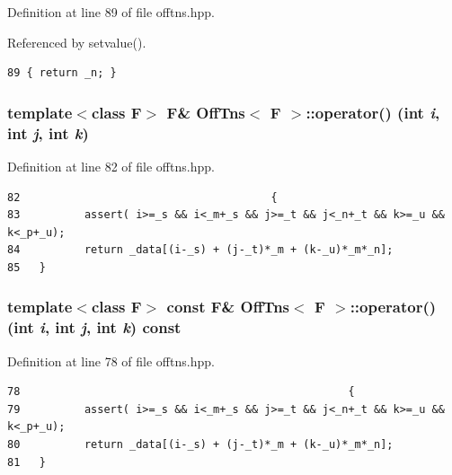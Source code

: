 Definition at line 89 of file offtns.hpp.

Referenced by setvalue().

\footnotesize\begin{verbatim}89 { return _n; }
\end{verbatim}\normalsize 


\subsubsection{\setlength{\rightskip}{0pt plus 5cm}template$<$class F$>$ F\& {\bf Off\-Tns}$<$ F $>$::operator() (int {\em i}, int {\em j}, int {\em k})\hspace{0.3cm}{\tt  [inline]}}\label{classOffTns_98d16077f76916ac1ab79f5d3ea6927f_98d16077f76916ac1ab79f5d3ea6927f}




Definition at line 82 of file offtns.hpp.

\footnotesize\begin{verbatim}82                                       {
83          assert( i>=_s && i<_m+_s && j>=_t && j<_n+_t && k>=_u && k<_p+_u);
84          return _data[(i-_s) + (j-_t)*_m + (k-_u)*_m*_n];
85   }
\end{verbatim}\normalsize 


\subsubsection{\setlength{\rightskip}{0pt plus 5cm}template$<$class F$>$ const F\& {\bf Off\-Tns}$<$ F $>$::operator() (int {\em i}, int {\em j}, int {\em k}) const\hspace{0.3cm}{\tt  [inline]}}\label{classOffTns_08f373a6228cbf6d82774853369056e3_08f373a6228cbf6d82774853369056e3}




Definition at line 78 of file offtns.hpp.

\footnotesize\begin{verbatim}78                                                   {
79          assert( i>=_s && i<_m+_s && j>=_t && j<_n+_t && k>=_u && k<_p+_u);
80          return _data[(i-_s) + (j-_t)*_m + (k-_u)*_m*_n];
81   }
\end{verbatim}\normalsize 


